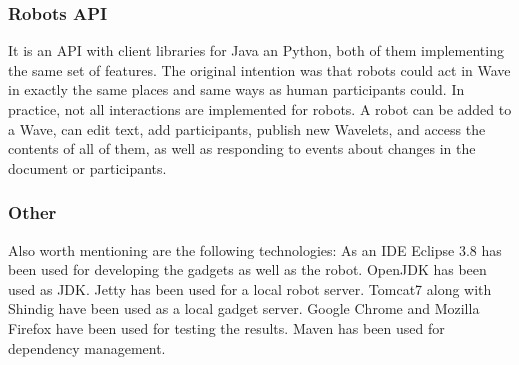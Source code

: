 \subsubsection{Robots API}
It is an API with client libraries for Java an Python, both of them implementing the same set of features. The original intention was that robots could act in Wave in exactly the same places and same ways as human participants could. In practice, not all interactions are implemented for robots. A robot can be added to a Wave, can edit text, add participants, publish new Wavelets, and access the contents of all of them, as well as responding to events about changes in the document or participants.

\subsubsection{Other}
Also worth mentioning are the following technologies:
As an IDE Eclipse 3.8 has been used for developing the gadgets as well as the robot. OpenJDK has been used as JDK. Jetty has been used for a local robot server. Tomcat7 along with Shindig have been used as a local gadget server. Google Chrome and Mozilla Firefox have been used for testing the results. Maven has been used for dependency management.

